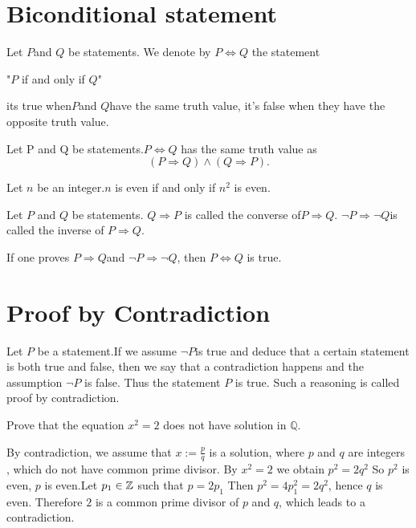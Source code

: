 \documentclass{book}
\numberwithin{equation}{section}
\begin{document}
\section{Biconditional statement}
\begin{definitionenv}
    Let $P$and $Q$ be statements. We denote by $P\Leftrightarrow Q$ the statement
    \begin{center}
        "$P$ if and only if $Q$"
    \end{center}
    its true when$P$and $Q$have the same truth value, it's false when they have the opposite truth value.
\end{definitionenv}
\begin{propositionenv}
    Let P and Q be statements.$P \Leftrightarrow Q$ has the same truth value as 
    $$(P\Rightarrow Q)\wedge (Q\Rightarrow P).$$
\end{propositionenv}
\begin{exampleenv}
    Let $n$ be an integer.$n$ is even if and only if $n^2$ is even.
\end{exampleenv}
\begin{definitionenv}
    Let $P$ and $Q$ be statements.
    \newline
    $Q\Rightarrow P$ is called the converse of$P\Rightarrow Q$.
    \newline
    $\neg P \Rightarrow \neg Q$is called the inverse of $P\Rightarrow Q$.
\end{definitionenv}
\begin{remark}
    If one proves $P\Rightarrow Q$and $\neg P\Rightarrow \neg Q$, then $P \Leftrightarrow Q$ is true.
\end{remark}




\section{Proof by Contradiction}
\begin{definitionenv}
    Let $P$ be a statement.If we assume $\neg P$is true and deduce that a certain statement is both true and false,  then we say that a contradiction happens and the assumption $\neg P$ is false. Thus the statement $P$ is true. Such a reasoning is called proof by contradiction.
\end{definitionenv}
\begin{exampleenv}
    Prove that the equation $x^2=2$ does not have solution in $\mathbb{Q}$.
    \begin{proofenv}
        By contradiction, we assume that $x:=\frac{p}{q}$ is a solution, where $p$ and $q$ are integers , which do not have common prime divisor. By $x^2=2$ we obtain $p^2=2q^2$
        So $p^2$ is even, $p$ is even.Let $p_1\in \mathbb{Z}$ such that $p=2p_1$
        Then $p^2=4p_1^2=2q^2$,  hence $q$ is even. Therefore $2$ is a common prime divisor of $p$ and $q$, which leads to a contradiction.
    \end{proofenv}
\end{exampleenv}
\end{document}

